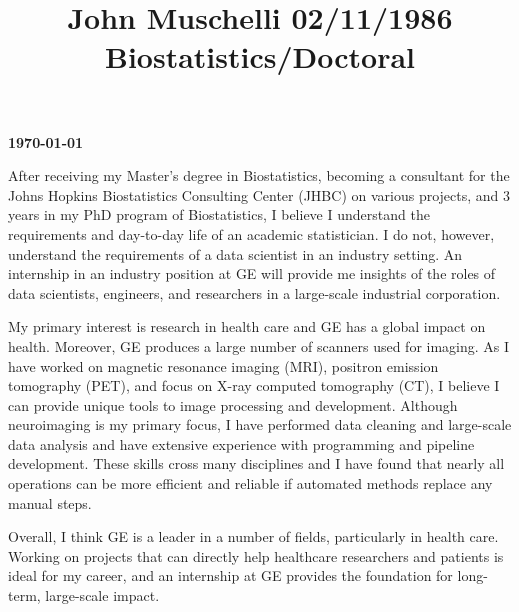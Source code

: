 \documentclass[12pt]{article}
\title{John Muschelli  \hfill 02/11/1986 \hfill Biostatistics/Doctoral} %
\newcommand{\company}{{GE }}
\begin{document}
\newbox\TempBox \newbox\TempBoxA
%
\def\undertilde#1{%
  \ifmmode\setbox\TempBox=\hbox{$#1$}\else\setbox\TempBox=\hbox{#1}\fi%
  \setbox\TempBoxA=\hbox to \wd\TempBox{\hss\char'176\hss}%
  \rlap{\copy\TempBox}\smash{\lower9pt\hbox{\copy\TempBoxA}}%
}
%
\def\undertildelow#1{%
  \ifmmode\setbox\TempBox=\hbox{$#1$}\else\setbox\TempBox=\hbox{#1}\fi%
  \setbox\TempBoxA=\hbox to \wd\TempBox{\hss\char'176\hss}%
  \rlap{\copy\TempBox}\smash{\lower10pt\hbox{\copy\TempBoxA}}%
}




\hfill {\bf \today\\}

\doublespacing
After receiving my Master's degree in Biostatistics, becoming a consultant for the Johns Hopkins Biostatistics Consulting Center (JHBC) on various projects, and 3 years in my PhD program of Biostatistics, I believe I understand the requirements and day-to-day life of an academic statistician.  I do not, however, understand the requirements of a data scientist in an industry setting.  An internship in an industry position at \company will provide me insights of the roles of data scientists, engineers, and researchers in a large-scale industrial corporation.

My primary interest is research in health care and \company has a global impact on health.  Moreover, \company produces a large number of scanners used for imaging.  As I have worked on magnetic resonance imaging (MRI), positron emission tomography (PET), and focus on X-ray computed tomography (CT), I believe I can provide unique tools to image processing and development.  Although neuroimaging is my primary focus, I have performed data cleaning and large-scale data analysis and have extensive experience with programming and pipeline development.   These skills cross many disciplines and I have found that nearly all operations can be more efficient and reliable if automated methods replace any manual steps.

Overall, I think \company is a leader in a number of fields, particularly in health care.  Working on projects that can directly help healthcare researchers and patients is ideal for my career, and an internship at \company provides the foundation for long-term, large-scale impact.
\end{document}
